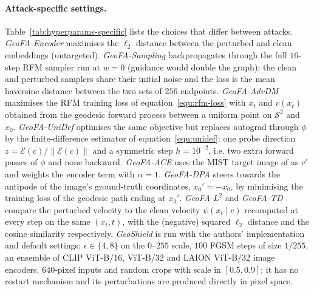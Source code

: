 \paragraph{Attack-specific settings.}
Table~\ref{tab:hyperparams-specific} lists the choices that differ between attacks.
\emph{GeoFA-Encoder} maximises the $\ell_2$ distance between the perturbed and clean
embeddings (untargeted). \emph{GeoFA-Sampling} backpropagates through the full $16$-step
RFM sampler run at $w=0$ (guidance would double the graph); the clean and perturbed samplers
share their initial noise and the loss is the mean haversine distance between the two sets of
$256$ endpoints. \emph{GeoFA-AdvDM} maximises the RFM training loss of
equation~\ref{equ:rfm-loss} with $x_t$ and $v(x_t)$ obtained from the geodesic forward process
between a uniform point on $\mathcal{S}^2$ and $x_0$. \emph{GeoFA-UniDef} optimises the same
objective but replaces autograd through $\phi$ by the finite-difference estimator of
equation~\ref{equ:unidef}: one probe direction $z=\mathcal{E}(c)/\lVert\mathcal{E}(c)\rVert$
and a symmetric step $h=10^{-2}$, i.e. two extra forward passes of $\phi$ and none backward.
\emph{GeoFA-ACE} uses the MIST target image of \citet{zheng2025ace} as $c'$ and weights the
encoder term with $\alpha=1$. \emph{GeoFA-DPA} steers towards the antipode of the image's
ground-truth coordinates, $x_0'=-x_0$, by minimising the training loss of the geodesic path
ending at $x_0'$. \emph{GeoFA-$L^2$} and \emph{GeoFA-TD} compare the perturbed velocity to the
clean velocity $\psi(x_t\mid c)$ recomputed at every step on the same $(x_t,t)$, with the
(negative) squared $\ell_2$ distance and the cosine similarity respectively.
\emph{GeoShield} is run with the authors' implementation and default settings:
$\epsilon\in\{4,8\}$ on the $0$--$255$ scale, $100$ FGSM steps of size $1/255$, an ensemble of
CLIP ViT-B/16, ViT-B/32 and LAION ViT-B/32 image encoders, $640$-pixel inputs and random
crops with scale in $[0.5,0.9]$; it has no restart mechanism and its perturbations are
produced directly in pixel space.

